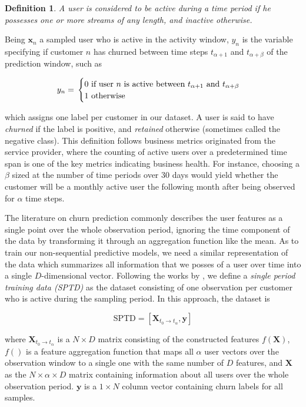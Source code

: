 \documentclass{kththesis}
\newtheorem{definition}{Definition}
\begin{document}
\begin{definition}
A user is considered to be \emph{active} during a time period if he possesses one or more streams of any length, and \emph{inactive} otherwise.
\end{definition}

Being $\mathbf{x}_n$ a sampled user who is active in the activity window, $y_{n}$ is the variable specifying if customer $n$ has churned between time steps $t_{\alpha+1}$ and $t_{\alpha+\beta}$ of the prediction window, such as

\begin{equation}
y_n = \\ 
\begin{cases}
  \text{0 if user $n$ is active between $t_{\alpha+1}$ and $t_{\alpha+\beta}$} \\    
  \text{1 otherwise}    
\end{cases}
\end{equation}

which assigns one label per customer in our dataset. A user is said to have \emph{churned} if the label is positive, and \emph{retained} otherwise (sometimes called the negative class). This definition follows business metrics originated from the service provider, where the counting of active users over a predetermined time span is one of the key metrics indicating business health. For instance, choosing a $\beta$ sized at the number of time periods over 30 days would yield whether the customer will be a monthly active user the following month after being observed for $\alpha$ time steps. 

The literature on churn prediction commonly describes the user features as a single point over the whole observation period, ignoring the time component of the data by transforming it through an aggregation function like the mean. As to train our non-sequential predictive models, we need a similar representation of the data which summarizes all information that we posses of a user over time into a single $D$-dimensional vector. Following the works by \citep{GurAli2014}, we define a \emph{single period training data (SPTD)} as the dataset consisting of one observation per customer who is active during the sampling period. In this approach, the dataset is 

\begin{equation}
\text{SPTD} = [\mathbf{X}_{t_0 \rightarrow t_\alpha}, \mathbf{y}]
\end{equation}

where $\mathbf{X}_{t_0\rightarrow t_\alpha}$ is a $N \times D$ matrix consisting of the constructed features $f(\mathbf{X})$, $f()$ is a feature aggregation function that maps all $\alpha$ user vectors over the observation window to a single one with the same number of $D$ features, and  $\mathbf{X}$ as the $N \times \alpha \times D$ matrix containing information about all users over the whole observation period. $\mathbf{y}$ is a $1 \times N$ column vector containing churn labels for all samples. 
\end{document}
